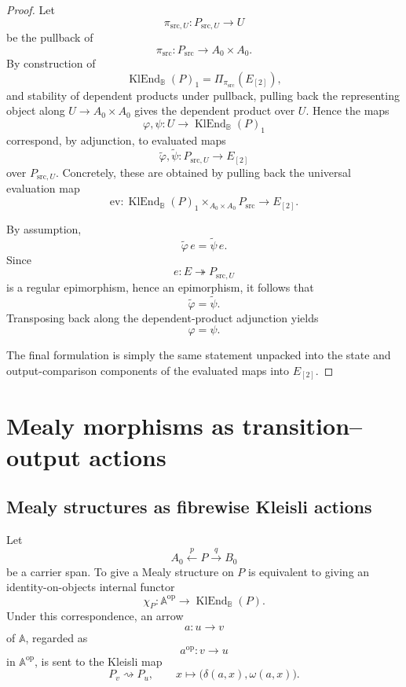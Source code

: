 \begin{proof}
    Let
    \[
        \pi_{\mathrm{src},U}:P_{\mathrm{src},U}\to U
    \]
    be the pullback of
    \[
        \pi_{\mathrm{src}}:P_{\mathrm{src}}\to A_0\times A_0.
    \]
    By construction of
    \[
        \operatorname{KlEnd}_{\mathbb B}(P)_1
        =
        \Pi_{\pi_{\mathrm{src}}}(E_{[2]}),
    \]
    and stability of dependent products under pullback, pulling back the representing object along \(U\to A_0\times A_0\) gives the dependent product over \(U\). Hence the maps
    \[
        \varphi,\psi:
        U\to \operatorname{KlEnd}_{\mathbb B}(P)_1
    \]
    correspond, by adjunction, to evaluated maps
    \[
        \widetilde{\varphi},\widetilde{\psi}:
        P_{\mathrm{src},U}\to E_{[2]}
    \]
    over \(P_{\mathrm{src},U}\). Concretely, these are obtained by pulling back
    the universal evaluation map
    \[
        \mathrm{ev}:
        \operatorname{KlEnd}_{\mathbb B}(P)_1
        \times_{A_0\times A_0}
        P_{\mathrm{src}}
        \to
        E_{[2]}.
    \]

    By assumption,
    \[
        \widetilde{\varphi}\,e
        =
        \widetilde{\psi}\,e.
    \]
    Since
    \[
        e:E\twoheadrightarrow P_{\mathrm{src},U}
    \]
    is a regular epimorphism, hence an epimorphism, it follows that
    \[
        \widetilde{\varphi}
        =
        \widetilde{\psi}.
    \]
    Transposing back along the dependent-product adjunction yields
    \[
        \varphi=\psi.
    \]

    The final formulation is simply the same statement unpacked into the state
    and output-comparison components of the evaluated maps into \(E_{[2]}\).
\end{proof}

\section{Mealy morphisms as transition--output actions}
\label{sec:residual-transition-output-actions}

\subsection{Mealy structures as fibrewise Kleisli actions}
\label{subsec:to-mealy-structures-as-kleisli-actions}

\begin{theorem}
\label{thm:to-mealy-structures-as-kleisli-actions}
    Let
    \[
        A_0\xleftarrow{p}P\xrightarrow{q}B_0
    \]
    be a carrier span. To give a Mealy structure on \(P\) is equivalent to
    giving an identity-on-objects internal functor
    \[
        \chi_P:
        \mathbb A^{\mathrm{op}}
        \to
        \operatorname{KlEnd}_{\mathbb B}(P).
    \]
    Under this correspondence, an arrow
    \[
        a:u\to v
    \]
    of \(\mathbb A\), regarded as
    \[
        a^{\mathrm{op}}:v\to u
    \]
    in \(\mathbb A^{\mathrm{op}}\), is sent to the Kleisli map
    \[
        P_v\rightsquigarrow P_u,
        \qquad
        x\longmapsto
        \bigl(\delta(a,x),\omega(a,x)\bigr).
    \]
\end{theorem}

